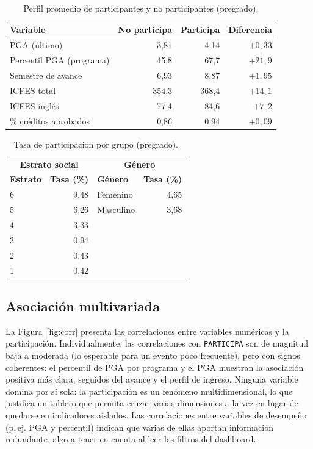 \documentclass[12pt,a4paper]{article}
\begin{document}
\begin{table}[H]
\centering
\caption{Perfil promedio de participantes y no participantes (pregrado).}
\label{tab:perfil}
\small
\begin{tabular}{l r r r}
\toprule
\textbf{Variable} & \textbf{No participa} & \textbf{Participa} & \textbf{Diferencia} \\
\midrule
PGA (último)                 & 3{,}81 & 4{,}14 & $+0{,}33$ \\
Percentil PGA (programa)     & 45{,}8 & 67{,}7 & $+21{,}9$ \\
Semestre de avance           & 6{,}93 & 8{,}87 & $+1{,}95$ \\
ICFES total                  & 354{,}3 & 368{,}4 & $+14{,}1$ \\
ICFES inglés                 & 77{,}4 & 84{,}6 & $+7{,}2$ \\
\% créditos aprobados        & 0{,}86 & 0{,}94 & $+0{,}09$ \\
\bottomrule
\end{tabular}
\end{table}

\begin{table}[H]
\centering
\caption{Tasa de participación por grupo (pregrado).}
\label{tab:grupos}
\small
\begin{tabular}{l r l r}
\toprule
\multicolumn{2}{c}{\textbf{Estrato social}} & \multicolumn{2}{c}{\textbf{Género}} \\
\textbf{Estrato} & \textbf{Tasa (\%)} & \textbf{Género} & \textbf{Tasa (\%)} \\
\midrule
6 & 9{,}48 & Femenino  & 4{,}65 \\
5 & 6{,}26 & Masculino & 3{,}68 \\
4 & 3{,}33 &           &        \\
3 & 0{,}94 &           &        \\
2 & 0{,}43 &           &        \\
1 & 0{,}42 &           &        \\
\bottomrule
\end{tabular}
\end{table}

\subsection{Asociación multivariada}
La Figura~\ref{fig:corr} presenta las correlaciones entre variables numéricas y
la participación. Individualmente, las correlaciones con \texttt{PARTICIPA} son de
magnitud baja a moderada (lo esperable para un evento poco frecuente), pero con
signos coherentes: el percentil de PGA por programa y el PGA muestran la
asociación positiva más clara, seguidos del avance y el perfil de ingreso. Ninguna
variable domina por sí sola: la participación es un fenómeno multidimensional, lo
que justifica un tablero que permita cruzar varias dimensiones a la vez en lugar de
quedarse en indicadores aislados. Las correlaciones entre variables de desempeño
(p.\,ej. PGA y percentil) indican que varias de ellas aportan información
redundante, algo a tener en cuenta al leer los filtros del dashboard.
\end{document}
